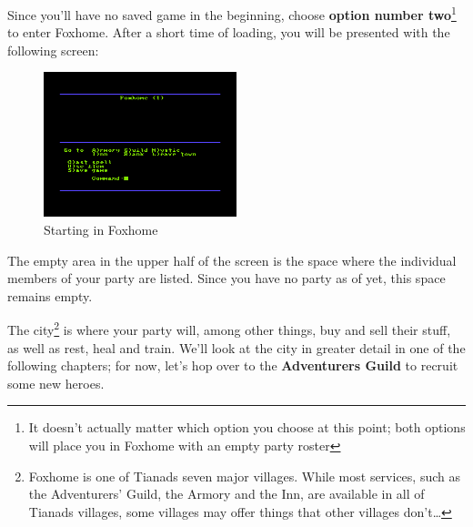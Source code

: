 \documentclass[12pt]{scrbook}
\begin{document}
Since you'll have no saved game in the beginning, choose \textbf{option number two}\footnote{It doesn't actually matter which option you choose at this point; both options will place you in Foxhome with an empty party roster} to enter Foxhome. After a short time of loading, you will be presented with the following screen:

\begin{figure}[ht]
    \centering
    \includegraphics[width=0.5\textwidth]{emptyCity}
    \caption{Starting in Foxhome}
\end{figure}

The empty area in the upper half of the screen is the space where the individual members of your party are listed. Since you have no party as of yet, this space remains empty.

The city\footnote{Foxhome is one of Tianads seven major villages. While most services, such as the Adventurers' Guild, the Armory and the Inn, are available in all of Tianads villages, some villages may offer things that other villages don't\dots} is where your party will, among other things, buy and sell their stuff, as well as rest, heal and train. We'll look at the city in greater detail in one of the following chapters; for now, let's hop over to the \textbf{Adventurers Guild} to recruit some new heroes.
\end{document}
